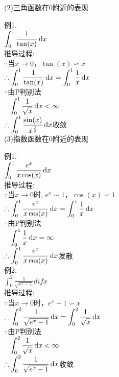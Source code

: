 (2)三角函数在$0$附近的表现\\
\begin{center}
\end{center}
例1.\\
$\displaystyle\int_0^1\frac{1}{\tan(x)}\mathop{}\!\mathrm{d} x$\\
推导过程:\\
$\because$当$x\to 0$，$\tan(x)\backsim x$\\
$\displaystyle\therefore\int_0^1\frac{1}{\tan(x)}\mathop{}\!\mathrm{d} x=\int_0^1\frac{1}{x}\mathop{}\!\mathrm{d} x$\\
$\because$由P判别法\\
$\displaystyle\phantom{\because}\int_0^1\frac{1}{\sqrt{x}}\mathop{}\!\mathrm{d} x<\infty$\\
$\displaystyle\therefore\int_0^1\frac{\sin(x)}{x^{\frac{3}{2}}}\mathop{}\!\mathrm{d} x$收敛\\[2ex]

(3)指数函数在$0$附近的表现\\
\begin{center}
\end{center}
例1.\\
$\displaystyle\int_0^1\frac{e^x}{x\cos(x)}\mathop{}\!\mathrm{d} x$\\
推导过程:\\
$\because$当$x\to 0$时, $e^x\backsim 1$，$\cos(x)\backsim 1$\\
$\displaystyle\therefore\int_0^1\frac{e^x}{x\cos(x)}\mathop{}\!\mathrm{d} x=\int_0^1\frac{1}{x}\mathop{}\!\mathrm{d} x$\\
$\because$由P判别法\\
$\displaystyle\phantom{\because}\int_0^1\frac{1}{x}\mathop{}\!\mathrm{d} x=\infty$\\
$\displaystyle\therefore\int_0^1\frac{e^x}{x\cos(x)}\mathop{}\!\mathrm{d} x$发散\\[1ex]

例2.\\
$\displaystyle\int_0^2\frac{1}{\sqrt{e^x-1}}dif x$\\
推导过程:\\
$\because$当$x\to 0$时，$e^x-1\backsim x$\\
$\displaystyle\therefore\int_0^2\frac{1}{\sqrt{e^x-1}}\mathop{}\!\mathrm{d} x=\int_0^2\frac{1}{\sqrt{x}}\mathop{}\!\mathrm{d} x$\\
$\because$由P判别法\\
$\displaystyle\phantom{\because}\int_0^2\frac{1}{\sqrt{x}}\mathop{}\!\mathrm{d} x<\infty$\\
$\displaystyle\therefore\int_0^2\frac{1}{\sqrt{e^x-1}}\mathop{}\!\mathrm{d} x$收敛\\[2ex]

